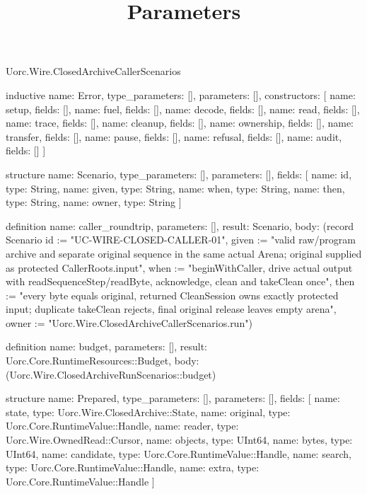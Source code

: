 \begin{lexlean}{Uorc.Wire.ClosedArchiveCallerScenarios}
\title{Parameters}
\begin{semanticmodule}
inductive{
  name: Error,
  type_parameters: [],
  parameters: [],
  constructors: [
    {name: setup, fields: []},
    {name: fuel, fields: []},
    {name: decode, fields: []},
    {name: read, fields: []},
    {name: trace, fields: []},
    {name: cleanup, fields: []},
    {name: ownership, fields: []},
    {name: transfer, fields: []},
    {name: pause, fields: []},
    {name: refusal, fields: []},
    {name: audit, fields: []}
  ]
}

structure{
  name: Scenario,
  type_parameters: [],
  parameters: [],
  fields: [
    {name: id, type: String},
    {name: given, type: String},
    {name: when, type: String},
    {name: then, type: String},
    {name: owner, type: String}
  ]
}

definition{
  name: caller_roundtrip,
  parameters: [],
  result: Scenario,
  body: (record Scenario {id := "UC-WIRE-CLOSED-CALLER-01", given := "valid raw/program archive and separate original sequence in the same actual Arena; original supplied as protected CallerRoots.input", when := "beginWithCaller, drive actual output with readSequenceStep/readByte, acknowledge, clean and takeClean once", then := "every byte equals original, returned CleanSession owns exactly protected input; duplicate takeClean rejects, final original release leaves empty arena", owner := "Uorc.Wire.ClosedArchiveCallerScenarios.run"})
}

definition{
  name: budget,
  parameters: [],
  result: Uorc.Core.RuntimeResources::Budget,
  body: (Uorc.Wire.ClosedArchiveRunScenarios::budget)
}

structure{
  name: Prepared,
  type_parameters: [],
  parameters: [],
  fields: [
    {name: state, type: Uorc.Wire.ClosedArchive::State},
    {name: original, type: Uorc.Core.RuntimeValue::Handle},
    {name: reader, type: Uorc.Wire.OwnedRead::Cursor},
    {name: objects, type: UInt64},
    {name: bytes, type: UInt64},
    {name: candidate, type: Uorc.Core.RuntimeValue::Handle},
    {name: search, type: Uorc.Core.RuntimeValue::Handle},
    {name: extra, type: Uorc.Core.RuntimeValue::Handle}
  ]
}


\end{semanticmodule}
\end{lexlean}
